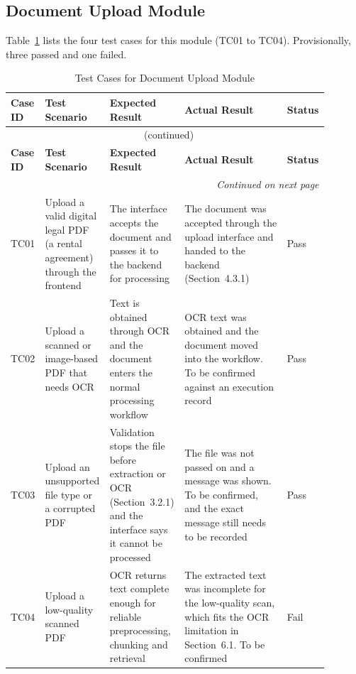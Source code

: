 \documentclass[12pt,a4paper,oneside]{report}
\begin{document}
\subsection{Document Upload Module}
Table~\ref{tab:upload} lists the four test cases for this module (TC01 to TC04). Provisionally, three passed and one failed.
{\footnotesize
\setlength{\tabcolsep}{3pt}
\renewcommand{\arraystretch}{1.15}
\begin{longtable}{|p{0.075\linewidth}|p{0.19\linewidth}|p{0.23\linewidth}|p{0.32\linewidth}|p{0.08\linewidth}|}
\caption{Test Cases for Document Upload Module}\label{tab:upload}\\
\hline
\textbf{Case ID} & \textbf{Test Scenario} & \textbf{Expected Result} & \textbf{Actual Result} & \textbf{Status}\\
\hline
\endfirsthead
\multicolumn{5}{c}{\tablename~\thetable{} (continued)}\\
\hline
\textbf{Case ID} & \textbf{Test Scenario} & \textbf{Expected Result} & \textbf{Actual Result} & \textbf{Status}\\
\hline
\endhead
\hline
\multicolumn{5}{r}{\emph{Continued on next page}}\\
\endfoot
\hline
\endlastfoot
TC01 & Upload a valid digital legal PDF (a rental agreement) through the frontend & The interface accepts the document and passes it to the backend for processing & The document was accepted through the upload interface and handed to the backend (Section~4.3.1) & Pass\\
\hline
TC02 & Upload a scanned or image-based PDF that needs OCR & Text is obtained through OCR and the document enters the normal processing workflow & OCR text was obtained and the document moved into the workflow. To be confirmed against an execution record & Pass\\
\hline
TC03 & Upload an unsupported file type or a corrupted PDF & Validation stops the file before extraction or OCR (Section~3.2.1) and the interface says it cannot be processed & The file was not passed on and a message was shown. To be confirmed, and the exact message still needs to be recorded & Pass\\
\hline
TC04 & Upload a low-quality scanned PDF & OCR returns text complete enough for reliable preprocessing, chunking and retrieval & The extracted text was incomplete for the low-quality scan, which fits the OCR limitation in Section~6.1. To be confirmed & Fail\\
\end{longtable}
}
\end{document}
